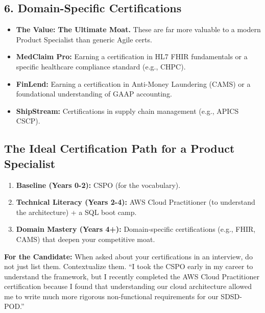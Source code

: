 \documentclass[
  11pt,
  openany,
  oneside]{book}
\providecommand{\tightlist}{%
  \setlength{\itemsep}{0pt}\setlength{\parskip}{0pt}}
\renewenvironment{quote}{\begin{customquote}}{\end{customquote}}
\begin{document}
\subsection{6. Domain-Specific
Certifications}\label{domain-specific-certifications}

\begin{itemize}
\tightlist
\item
  \textbf{The Value:} \textbf{The Ultimate Moat.} These are far more
  valuable to a modern Product Specialist than generic Agile certs.
\item
  \textbf{MedClaim Pro:} Earning a certification in HL7 FHIR
  fundamentals or a specific healthcare compliance standard (e.g.,
  CHPC).
\item
  \textbf{FinLend:} Earning a certification in Anti-Money Laundering
  (CAMS) or a foundational understanding of GAAP accounting.
\item
  \textbf{ShipStream:} Certifications in supply chain management (e.g.,
  APICS CSCP).
\end{itemize}

\subsection{The Ideal Certification Path for a Product
Specialist}\label{the-ideal-certification-path-for-a-product-specialist}

\begin{enumerate}
\def\labelenumi{\arabic{enumi}.}
\tightlist
\item
  \textbf{Baseline (Years 0-2):} CSPO (for the vocabulary).
\item
  \textbf{Technical Literacy (Years 2-4):} AWS Cloud Practitioner (to
  understand the architecture) + a SQL boot camp.
\item
  \textbf{Domain Mastery (Years 4+):} Domain-specific certifications
  (e.g., FHIR, CAMS) that deepen your competitive moat.
\end{enumerate}

\begin{quote}
\textbf{For the Candidate:} When asked about your certifications in an
interview, do not just list them. Contextualize them. ``I took the CSPO
early in my career to understand the framework, but I recently completed
the AWS Cloud Practitioner certification because I found that
understanding our cloud architecture allowed me to write much more
rigorous non-functional requirements for our SDSD-POD.''
\end{quote}
\end{document}
